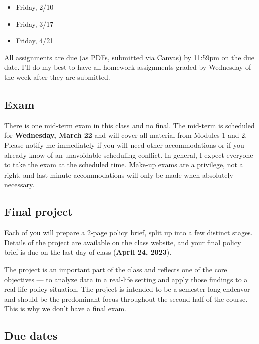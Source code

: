 \documentclass[11pt,]{article}
\providecommand{\tightlist}{%
  \setlength{\itemsep}{0pt}\setlength{\parskip}{0pt}}
\begin{document}
\begin{itemize}
\tightlist
\item
  Friday, 2/10
\item
  Friday, 3/17
\item
  Friday, 4/21
\end{itemize}

All assignments are due (as PDFs, submitted via Canvas) by 11:59pm on
the due date. I'll do my best to have all homework assignments graded by
Wednesday of the week after they are submitted.

\hypertarget{exam}{%
\subsection{Exam}\label{exam}}

There is one mid-term exam in this class and no final. The mid-term is
scheduled for \textbf{Wednesday, March 22} and will cover all material
from Modules 1 and 2. Please notify me immediately if you will need
other accommodations or if you already know of an unavoidable scheduling
conflict. In general, I expect everyone to take the exam at the
scheduled time. Make-up exams are a privilege, not a right, and last
minute accommodations will only be made when absolutely necessary.

\hypertarget{final-project}{%
\subsection{Final project}\label{final-project}}

Each of you will prepare a 2-page policy brief, split up into a few
distinct stages. Details of the project are available on the
\href{https://econ372s23.classes.ianmccarthyecon.com/}{class website},
and your final policy brief is due on the last day of class
(\textbf{April 24, 2023}).

The project is an important part of the class and reflects one of the
core objectives --- to analyze data in a real-life setting and apply
those findings to a real-life policy situation. The project is intended
to be a semester-long endeavor and should be the predominant focus
throughout the second half of the course. This is why we don't have a
final exam.

\hypertarget{due-dates}{%
\subsection{Due dates}\label{due-dates}}
\end{document}
